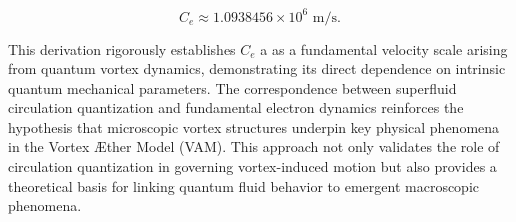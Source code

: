 \begin{equation*}
C_e \approx 1.0938456 \times 10^6 \text{ m/s}.
\end{equation*}

This derivation rigorously establishes  $ C_e $ a as a fundamental velocity scale arising from quantum vortex dynamics, demonstrating its direct dependence on intrinsic quantum mechanical parameters. The correspondence between superfluid circulation quantization and fundamental electron dynamics reinforces the hypothesis that microscopic vortex structures underpin key physical phenomena in the Vortex \AE ther Model (VAM). This approach not only validates the role of circulation quantization in governing vortex-induced motion but also provides a theoretical basis for linking quantum fluid behavior to emergent macroscopic phenomena.


